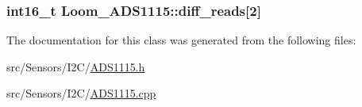 \subsubsection[{\texorpdfstring{diff\+\_\+reads}{diff_reads}}]{\setlength{\rightskip}{0pt plus 5cm}int16\+\_\+t Loom\+\_\+\+A\+D\+S1115\+::diff\+\_\+reads\mbox{[}2\mbox{]}\hspace{0.3cm}{\ttfamily [protected]}}\hypertarget{class_loom___a_d_s1115_a8f56df6850f8837b029f0f52515a3f38}{}\label{class_loom___a_d_s1115_a8f56df6850f8837b029f0f52515a3f38}


The documentation for this class was generated from the following files\+:\begin{DoxyCompactItemize}
\item 
src/\+Sensors/\+I2\+C/\hyperlink{_a_d_s1115_8h}{A\+D\+S1115.\+h}\item 
src/\+Sensors/\+I2\+C/\hyperlink{_a_d_s1115_8cpp}{A\+D\+S1115.\+cpp}\end{DoxyCompactItemize}
